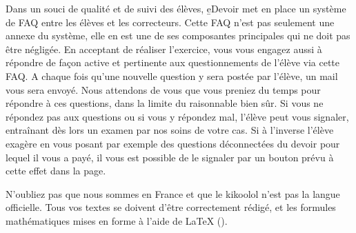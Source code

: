 ﻿Dans un souci de qualité et de suivi des élèves, \b{eDevoir} met en place un système de FAQ entre les élèves et les correcteurs. Cette FAQ n’est pas seulement une annexe du système, elle en est une de ses composantes principales qui ne doit pas être négligée.
En acceptant de réaliser l’exercice, vous vous engagez aussi à répondre de façon active et pertinente aux questionnements de l’élève via cette FAQ. A chaque fois qu’une nouvelle question y sera postée par l’élève, un mail vous sera envoyé. Nous attendons de vous que vous preniez du temps pour répondre à ces questions, dans la limite du raisonnable bien sûr.
Si vous ne répondez pas aux questions ou si vous y répondez mal, l’élève peut vous signaler, entraînant dès lors un examen par nos soins de votre cas. Si à l’inverse l’élève exagère en vous posant par exemple des questions déconnectées du devoir pour lequel il vous a payé, il vous est possible de le signaler par un bouton prévu à cette effet dans la page.

N’oubliez pas que nous sommes en France et que le kikoolol n’est pas la langue officielle. Tous vos textes se doivent d’être correctement rédigé, et les formules mathématiques mises en forme à l’aide de LaTeX ().